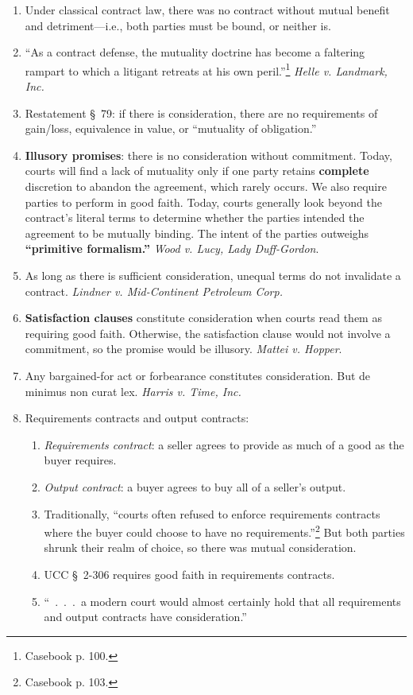 \begin{enumerate}
    \item Under classical contract law, there was no contract without mutual 
    benefit and detriment---i.e., both parties must be bound, or neither is.
    \item ``As a contract defense, the mutuality doctrine has become a 
    faltering rampart to which a litigant retreats at his own 
    peril.''\footnote{Casebook p.  100.} \emph{Helle v. Landmark, Inc.}
    \item Restatement \S\ 79: if there is consideration, there are no 
    requirements of gain/loss, equivalence in value, or ``mutuality of 
    obligation.''
    \item \textbf{Illusory promises}: there is no consideration without 
    commitment. Today, courts will find a lack of mutuality only if one party 
    retains \textbf{complete} discretion to abandon the agreement, which 
    rarely occurs. We also require parties to perform in good faith. Today, 
    courts generally look beyond the contract's literal terms to determine 
    whether the parties intended the agreement to be mutually binding. The 
    intent of the parties outweighs \textbf{``primitive formalism.''} 
    \emph{Wood v. Lucy, Lady Duff-Gordon}.
    \item As long as there is sufficient consideration, unequal terms do not 
    invalidate a contract. \emph{Lindner v. Mid-Continent Petroleum Corp.}
    \item \textbf{Satisfaction clauses} constitute consideration when courts 
    read them as requiring good faith. Otherwise, the satisfaction clause 
    would not involve a commitment, so the promise would be illusory. 
    \emph{Mattei v. Hopper}.
    \item Any bargained-for act or forbearance constitutes consideration. But 
    de minimus non curat lex. \emph{Harris v. Time, Inc.}
    \item Requirements contracts and output contracts:
    \begin{enumerate}
        \item \emph{Requirements contract}: a seller agrees to provide as much 
        of a good as the buyer requires.
        \item \emph{Output contract}: a buyer agrees to buy all of a seller's 
        output.
        \item Traditionally, ``courts often refused to enforce requirements 
        contracts where the buyer could choose to have no 
        requirements.''\footnote{Casebook p. 103.} But both parties shrunk 
        their realm of choice, so there was mutual consideration.
        \item UCC \S\ 2-306 requires good faith in requirements contracts.
        \item ``~.~.~.~a modern court would almost certainly hold that all 
        requirements and output contracts have consideration.''
    \end{enumerate}
\end{enumerate}

